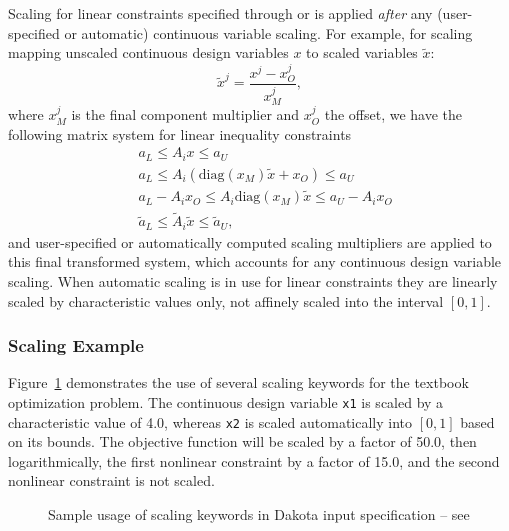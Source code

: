 Scaling for linear constraints specified through
 or
 is applied {\em after} any
(user-specified or automatic) continuous variable scaling. For
example, for scaling mapping unscaled continuous design variables $x$
to scaled variables $\tilde{x}$:
\[ \tilde{x}^j = \frac{x^j - x^j_O}{x^j_M}, \]
where $x^j_M$ is the final component multiplier and $x^j_O$ the
offset, we have the following matrix system for linear inequality
constraints
\begin{eqnarray*}
& a_L \leq A_i x \leq a_U \\
& a_L \leq A_i \left( \mathrm{diag}(x_M) \tilde{x} + x_O \right) \leq a_U \\
& a_L - A_i x_O \leq A_i \mathrm{diag}(x_M) \tilde{x} \leq a_U - A_i x_O \\
& \tilde{a}_L \leq \tilde{A}_i \tilde{x} \leq \tilde{a}_U,
\end{eqnarray*}
and user-specified or automatically computed scaling multipliers are
applied to this final transformed system, which accounts for any
continuous design variable scaling. When automatic scaling is in use
for linear constraints they are linearly scaled by characteristic
values only, not affinely scaled into the interval $[0,1]$.

\subsubsection{Scaling Example}
\label{opt:additional:scaling:example}

Figure~\ref{opt:additional:scaling:example:figure01} demonstrates the
use of several scaling keywords for the textbook optimization problem.
The continuous design variable {\tt x1} is scaled by a characteristic
value of 4.0, whereas {\tt x2} is scaled automatically into $[0,1]$
based on its bounds. The objective function will be scaled by a factor
of 50.0, then logarithmically, the first nonlinear constraint by a
factor of 15.0, and the second nonlinear constraint is not scaled.

\begin{figure}
\centering
\begin{bigbox}
\begin{small}
\end{small}
\end{bigbox}
\caption{Sample usage of scaling keywords in Dakota input specification --
see \protect{} }
\label{opt:additional:scaling:example:figure01}
\end{figure}

